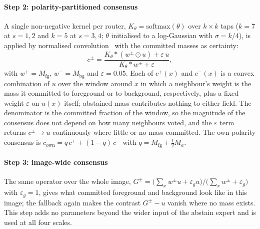 \paragraph*{Step 2: polarity-partitioned consensus} A single non-negative kernel per router, $K_\theta=\mathrm{softmax}(\theta)$ over $k\times k$ taps ($k=7$ at $s=1,2$ and $k=5$ at $s=3,4$; $\theta$ initialised to a log-Gaussian with $\sigma=k/4$), is applied by normalised convolution~\cite{knutsson1993normalized} with the committed masses as certainty:
\begin{equation}
c^{\pm}=\frac{K_\theta\ast(w^{\pm}\odot u)+\varepsilon\,u}{K_\theta\ast w^{\pm}+\varepsilon},
\label{eq:nconv}
\end{equation}
with $w^{+}=M_{\mathrm{fg}}$, $w^{-}=M_{\mathrm{bg}}$ and $\varepsilon=0.05$.
Each of $c^{+}(x)$ and $c^{-}(x)$ is a convex combination of $u$ over the window around $x$ in which a neighbour's weight is the mass it committed to foreground or to background, respectively, plus a fixed weight $\varepsilon$ on $u(x)$ itself; abstained mass contributes nothing to either field. The denominator is the committed fraction of the window, so the magnitude of the consensus does not depend on how many neighbours voted, and the $\varepsilon$ term returns $c^{\pm}\to u$ continuously where little or no mass committed. The own-polarity consensus is $c_{\mathrm{own}}=q\,c^{+}+(1-q)\,c^{-}$ with $q=M_{\mathrm{fg}}+\tfrac12M_a$.

\paragraph*{Step 3: image-wide consensus} The same operator over the whole image, $G^{\pm}=\bigl(\sum_x w^{\pm}u+\varepsilon_g u\bigr)/\bigl(\sum_x w^{\pm}+\varepsilon_g\bigr)$ with $\varepsilon_g=1$, gives what committed foreground and background look like in this image; the fallback again makes the contrast $G^{\pm}-u$ vanish where no mass exists. This step adds no parameters beyond the wider input of the abstain expert and is used at all four scales.

